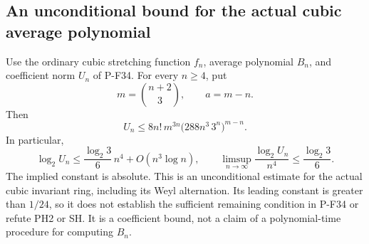 \subsection{An unconditional bound for the actual cubic average polynomial}

\begin{proposition}
\label{prop:cubicaverageupper}
Use the ordinary cubic stretching function $f_n$, average polynomial
$B_n$, and coefficient norm $U_n$ of P-F34. For every $n\ge4$, put
\[
 m=\binom{n+2}{3},\qquad a=m-n.
\]
Then
\[
 U_n\le
 8n!\,m^{3n}\bigl(288n^3\,3^n\bigr)^{m-n}.
 \tag{P-F42a}
\]
In particular,
\[
 \log_2 U_n\le
 \frac{\log_2 3}{6}\,n^4+O(n^3\log n),\qquad
 \limsup_{n\longrightarrow\infty}
       \frac{\log_2 U_n}{n^4}
       \le\frac{\log_2 3}{6}.
 \tag{P-F42b}
\]
The implied constant is absolute. This is an unconditional estimate
for the actual cubic invariant ring, including its Weyl alternation.
Its leading constant is greater than $1/24$, so it does not establish
the sufficient remaining condition in P-F34 or refute PH2 or SH.
It is a coefficient bound, not a claim of a polynomial-time procedure
for computing $B_n$.
\end{proposition}

